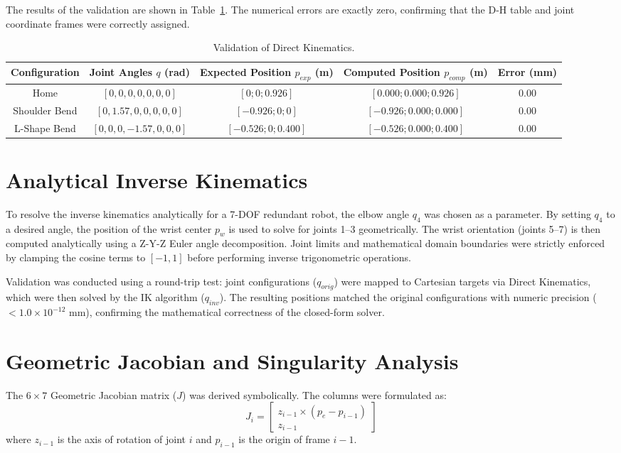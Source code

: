 \documentclass[11pt,a4paper]{article}
\begin{document}
The results of the validation are shown in Table~\ref{tab:dk_validation}. The numerical errors are exactly zero, confirming that the D-H table and joint coordinate frames were correctly assigned.

\begin{table}[H]
\centering
\caption{Validation of Direct Kinematics.}
\label{tab:dk_validation}
\begin{tabular}{@{}ccccc@{}}
\toprule
Configuration & Joint Angles $q$ (rad) & Expected Position $p_{exp}$ (m) & Computed Position $p_{comp}$ (m) & Error (mm) \\ \midrule
Home          & $[0, 0, 0, 0, 0, 0, 0]$ & $[0; 0; 0.926]$ & $[0.000; 0.000; 0.926]$ & 0.00 \\
Shoulder Bend & $[0, 1.57, 0, 0, 0, 0, 0]$ & $[-0.926; 0; 0]$ & $[-0.926; 0.000; 0.000]$ & 0.00 \\
L-Shape Bend  & $[0, 0, 0, -1.57, 0, 0, 0]$ & $[-0.526; 0; 0.400]$ & $[-0.526; 0.000; 0.400]$ & 0.00 \\ \bottomrule
\end{tabular}
\end{table}

\section{Analytical Inverse Kinematics}
To resolve the inverse kinematics analytically for a 7-DOF redundant robot, the elbow angle $q_4$ was chosen as a parameter. By setting $q_4$ to a desired angle, the position of the wrist center $p_w$ is used to solve for joints 1--3 geometrically. The wrist orientation (joints 5--7) is then computed analytically using a Z-Y-Z Euler angle decomposition. Joint limits and mathematical domain boundaries were strictly enforced by clamping the cosine terms to $[-1, 1]$ before performing inverse trigonometric operations.

Validation was conducted using a round-trip test: joint configurations ($q_{orig}$) were mapped to Cartesian targets via Direct Kinematics, which were then solved by the IK algorithm ($q_{inv}$). The resulting positions matched the original configurations with numeric precision ($< 1.0\times 10^{-12}\text{ mm}$), confirming the mathematical correctness of the closed-form solver.

\section{Geometric Jacobian and Singularity Analysis}
The $6 \times 7$ Geometric Jacobian matrix ($J$) was derived symbolically. The columns were formulated as:
\begin{equation}
J_i = \begin{bmatrix} z_{i-1} \times (p_e - p_{i-1}) \\ z_{i-1} \end{bmatrix}
\end{equation}
where $z_{i-1}$ is the axis of rotation of joint $i$ and $p_{i-1}$ is the origin of frame $i-1$.
\end{document}
